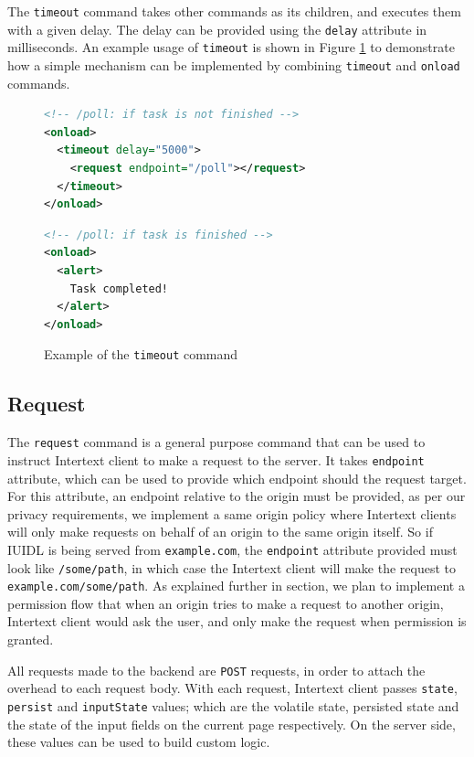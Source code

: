 The \texttt{timeout} command takes other commands as its children, and executes them with a given delay. The delay can be provided using the \texttt{delay} attribute in milliseconds. An example usage of \texttt{timeout} is shown in Figure \ref{fig:timeout_usage} to demonstrate how a simple  mechanism can be implemented by combining \texttt{timeout} and \texttt{onload} commands.

\begin{figure}[htb]
\begin{minipage}{\linewidth}
\begin{lstlisting}[language=xml]
<!-- /poll: if task is not finished -->
<onload>
  <timeout delay="5000">
    <request endpoint="/poll"></request>
  </timeout>
</onload>
\end{lstlisting}
\begin{lstlisting}[language=xml]
<!-- /poll: if task is finished -->
<onload>
  <alert>
    Task completed!
  </alert>
</onload>
\end{lstlisting}
\end{minipage}
\caption{Example of the \texttt{timeout} command}%
\label{fig:timeout_usage}%
\end{figure}

\subsection{Request}

The \texttt{request} command is a general purpose command that can be used to instruct Intertext client to make a request to the server. It takes \texttt{endpoint} attribute, which can be used to provide which endpoint should the request target. For this attribute, an endpoint relative to the origin must be provided, as per our privacy requirements, we implement a same origin policy where Intertext clients will only make requests on behalf of an origin to the same origin itself. So if IUIDL is being served from \texttt{example.com}, the \texttt{endpoint} attribute provided must look like \texttt{/some/path}, in which case the Intertext client will make the request to \texttt{example.com/some/path}. As explained further in  section, we plan to implement a permission flow that when an origin tries to make a request to another origin, Intertext client would ask the user, and only make the request when permission is granted.

All requests made to the backend are \texttt{POST} requests, in order to attach the overhead to each request body. With each request, Intertext client passes \texttt{state}, \texttt{persist} and \texttt{inputState} values; which are the volatile state, persisted state and the state of the input fields on the current page respectively. On the server side, these values can be used to build custom logic.

